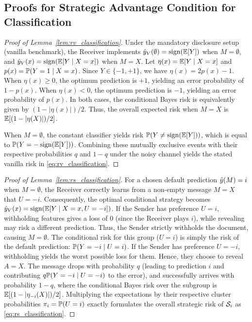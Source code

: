 \subsection{Proofs for Strategic Advantage Condition for Classification}
\label{app:classification}

\begin{proof}[Proof of Lemma~\ref{lem:rv_classification}]
Under the mandatory disclosure setup (vanilla benchmark), the Receiver implements $\hat{y}_V(\emptyset) = \operatorname{sign}(\mathbb{E}[Y])$ when $M = \emptyset$, and $\hat{y}_V(x) = \operatorname{sign}(\mathbb{E}[Y \mid X=x])$ when $M = X$.
Let $\eta(x) = \mathbb{E}[Y \mid X=x]$ and $p(x) = \mathbb{P}(Y=1 \mid X=x)$. Since $Y \in \{-1, +1\}$, we have $\eta(x) = 2p(x) - 1$.
When $\eta(x) \ge 0$, the optimum prediction is $+1$, yielding an error probability of $1 - p(x)$. When $\eta(x) < 0$, the optimum prediction is $-1$, yielding an error probability of $p(x)$. In both cases, the conditional Bayes risk is equivalently given by $(1 - |\eta(x)|)/2$. Thus, the overall expected risk when $M=X$ is $\mathbb{E}[(1 - |\eta(X)|)/2]$.

When $M = \emptyset$, the constant classifier yields risk $\mathbb{P}(Y \neq \operatorname{sign}(\mathbb{E}[Y]))$, which is equal to $\mathbb{P}(Y = -\operatorname{sign}(\mathbb{E}[Y]))$. 
Combining these mutually exclusive events with their respective probabilities $q$ and $1-q$ under the noisy channel yields the stated vanilla risk in \eqref{eq:rv_classification}.
\end{proof}

\begin{proof}[Proof of Lemma~\ref{lem:rs_classification}]
For a chosen default prediction $\hat{y}(M) = i$ when $M = \emptyset$, the Receiver correctly learns from a non-empty message $M = X$ that $U = -i$. Consequently, the optimal conditional strategy becomes $\hat{y}_V(x) = \operatorname{sign}(\mathbb{E}[Y \mid X=x, U=-i])$. 
If the Sender has preference $U = i$, withholding features gives a loss of $0$ (since the Receiver plays $i$), while revealing may risk a different prediction. Thus, the Sender strictly withholds the document, causing $M = \emptyset$. The conditional risk for this group ($U = i$) is simply the risk of the default prediction: $\mathbb{P}(Y = -i \mid U=i)$.
If the Sender has preference $U = -i$, withholding yields the worst possible loss for them. Hence, they choose to reveal $A = X$. The message drops with probability $q$ (leading to prediction $i$ and contributing $q\mathbb{P}(Y = -i \mid U=-i)$ to the error), and successfully arrives with probability $1-q$, where the conditional Bayes risk over the subgroup is $\mathbb{E}[(1-|\eta_{-i}(X)|)/2]$.
Multiplying the expectations by their respective cluster probabilities $\pi_i = \mathbb{P}(U=i)$ exactly formulates the overall strategic risk of $\mathcal{S}_i$ as \eqref{eq:rs_classification}.
\end{proof}


